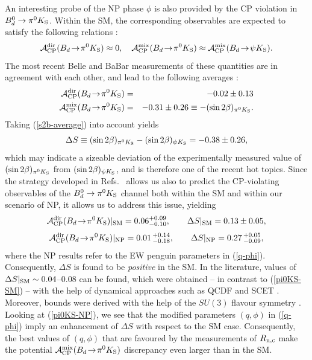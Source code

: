 \documentclass[11pt]{cernrep}
\begin{document}
An interesting probe of the NP phase $\phi$ is also provided
by the CP violation in  $B^0_d\to\pi^0 K_{\rm S}$. Within the SM,
the corresponding observables are expected to satisfy the following 
relations \cite{PAPIII}:
\begin{equation}\label{Bdpi0K0-rel}
{\cal A}_{\rm CP}^{\rm dir}(B_d\!\to\!\pi^0 K_{\rm S})\approx 0, \quad
{\cal A}_{\rm CP}^{\rm mix}(B_d\!\to\!\pi^0 K_{\rm S})\approx
{\cal A}_{\rm CP}^{\rm mix}(B_d\!\to\!\psi K_{\rm S}).
\end{equation}
The most recent  Belle \cite{Belle-Bphi-K} and BaBar \cite{BaBar-pi0KS}
measurements of these quantities are in agreement with each other, and 
lead to the following averages \cite{HFAG}:
\begin{eqnarray}
{\cal A}_{\rm CP}^{\rm dir}(B_d\!\to\!\pi^0 K_{\rm S})&=&-0.02\pm0.13\\
{\cal A}_{\rm CP}^{\rm mix}(B_d\!\to\!\pi^0 K_{\rm S})&=&-0.31\pm0.26
\equiv -(\sin2\beta)_{\pi^0K_{\rm S}}.
\end{eqnarray}
Taking (\ref{s2b-average}) into account yields
\begin{equation}\label{DS}
\Delta S \equiv (\sin2\beta)_{\pi^0K_{\rm S}}-
(\sin2\beta)_{\psi K_{\rm S}} =%
-0.38\pm 0.26,
\end{equation}
which may indicate a sizeable deviation of the
experimentally measured value of $(\sin2\beta)_{\pi^0K_{\rm S}}$ from
$(\sin2\beta)_{\psi K_{\rm S}}$, and is therefore one of the recent hot topics. 
Since the strategy developed in Refs.~\cite{BFRS2,BFRS3} allows us also to predict the 
CP-violating observables of the $B^0_d\to\pi^0 K_{\rm S}$ channel both within the 
SM and within our scenario of NP, it allows us to address this issue, yielding
\begin{equation}\label{pi0KS-SM}
{\cal A}_{\rm CP}^{\rm dir}(B_d\!\to\!\pi^0 K_{\rm S})|_{\rm SM}=0.06^{+0.09}_{-0.10},
\qquad
\Delta S\vert_{\rm SM}= 0.13\pm0.05, 
\end{equation}
\begin{equation}\label{pi0KS-NP}
{\cal A}_{\rm CP}^{\rm dir}(B_d\!\to\!\pi^0 K_{\rm S})|_{\rm NP}=0.01\,^{+0.14}_{-0.18}, 
\qquad \Delta S\vert_{\rm NP}=0.27\,^{+0.05}_{-0.09},
\end{equation}
where the NP results refer to the EW penguin parameters in (\ref{q-phi}). Consequently,
$\Delta S$ is found to be {\it positive} in the SM. In the literature, values of
$\Delta S\vert_{\rm SM}\sim0.04$--$0.08$ can be found, which were obtained
-- in contrast to (\ref{pi0KS-SM})  -- with the help of dynamical approaches such as QCDF \cite{beneke} and SCET \cite{SCET-Bdpi0K0}. Moreover, 
bounds were derived with the help of the $SU(3)$ flavour symmetry 
\cite{SU3-bounds}. Looking at (\ref{pi0KS-NP}), we see that the modified  
parameters $(q,\phi)$ in (\ref{q-phi}) imply an enhancement of $\Delta S$ with 
respect to the SM case. Consequently, the best values of $(q,\phi)$ that are 
favoured by the measurements of $R_{\rm n,c}$ make the potential 
${\cal A}_{\rm CP}^{\rm mix}(B_d\!\to\!\pi^0 K_{\rm S})$ discrepancy 
even larger than in the SM. 
\end{document}
